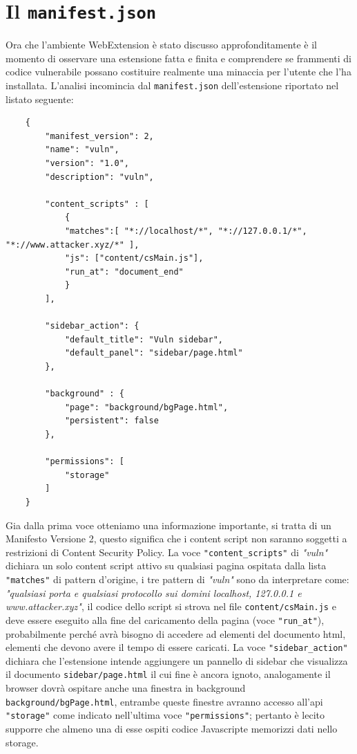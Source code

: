 \documentclass{sapthesis}
\newcommand{\code}[1]{\texttt{#1}}
\newcommand{\file}[1]{\code{#1}}
\newcommand{\vuln}{\textit{"vuln"}}
\newcommand{\JS}{Javascript}
\newcommand{\manifest}{\code{manifest.json} }
\begin{document}
    \section{Il \manifest}
    \label{sec:analisi-vuln-manifest}
        Ora che l'ambiente WebExtension è stato discusso approfonditamente è il momento di
        osservare una estensione fatta e finita e comprendere se frammenti di codice vulnerabile
        possano costituire realmente una minaccia per l'utente che l'ha installata.
        L'analisi incomincia dal \manifest dell'estensione riportato nel listato seguente:
        \begin{lstlisting}
    {
        "manifest_version": 2,
        "name": "vuln",
        "version": "1.0",
        "description": "vuln",

        "content_scripts" : [
            {
            "matches":[ "*://localhost/*", "*://127.0.0.1/*", "*://www.attacker.xyz/*" ],
            "js": ["content/csMain.js"],
            "run_at": "document_end"
            }
        ],

        "sidebar_action": {
            "default_title": "Vuln sidebar",
            "default_panel": "sidebar/page.html"
        },

        "background" : {
            "page": "background/bgPage.html",
            "persistent": false
        },

        "permissions": [
            "storage"
        ]
    }
        \end{lstlisting}
        Gia dalla prima voce otteniamo una informazione importante, si tratta di un Manifesto Versione 2,
        questo significa che i content script non saranno soggetti a restrizioni di Content Security Policy.
        La voce \code{"content\_scripts"} di \vuln{} dichiara un solo content script attivo su qualsiasi pagina ospitata dalla
        lista \code{"matches"} di pattern d'origine, i tre pattern di \vuln{} sono da interpretare come:
        \textit{"qualsiasi porta e qualsiasi protocollo sui domini localhost, 127.0.0.1 e www.attacker.xyz"},
        il codice dello script si strova nel file \file{content/csMain.js} e deve essere eseguito
        alla fine del caricamento della pagina (voce \code{"run\_at"}), probabilmente perché avrà bisogno
        di accedere ad elementi del documento html, elementi che devono avere il tempo di essere caricati.
        La voce \code{"sidebar\_action"} dichiara che l'estensione intende aggiungere un pannello di sidebar
        che visualizza il documento \file{sidebar/page.html} il cui fine è ancora ignoto, analogamente
        il browser dovrà ospitare anche una finestra in background \file{background/bgPage.html}, entrambe
        queste finestre avranno accesso all'api \code{"storage"} come indicato nell'ultima voce \code{"permissions"};
        pertanto è lecito supporre che almeno una di esse ospiti codice \JS e memorizzi dati nello storage.
        
\end{document}
